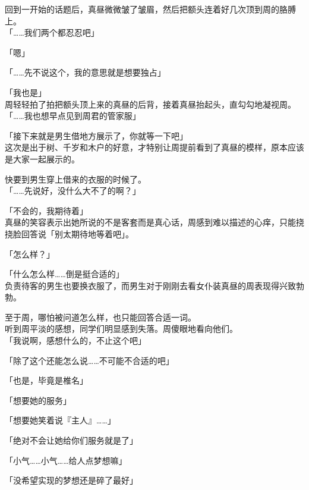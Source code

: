 回到一开始的话题后，真昼微微皱了皱眉，然后把额头连着好几次顶到周的胳膊上。\\

「……我们两个都忍忍吧」

「嗯」

「……先不说这个，我的意思就是想要独占」

「我也是」\\

周轻轻拍了拍把额头顶上来的真昼的后背，接着真昼抬起头，直勾勾地凝视周。\\

「……我也想早点见到周君的管家服」

「接下来就是男生借地方展示了，你就等一下吧」\\

这次是出于树、千岁和木户的好意，才特别让周提前看到了真昼的模样，原本应该是大家一起展示的。

快要到男生穿上借来的衣服的时候了。\\

「……先说好，没什么大不了的啊？」

「不会的，我期待着」\\

真昼的笑容表示出她所说的不是客套而是真心话，周感到难以描述的心痒，只能挠挠脸回答说「别太期待地等着吧」。\\

\vspace{2\baselineskip}

「怎么样？」

「什么怎么样……倒是挺合适的」\\

负责待客的男生也要换衣服了，而男生对于刚刚去看女仆装真昼的周表现得兴致勃勃。

至于周，哪怕被问道怎么样，也只能回答合适一词。\\

听到周平淡的感想，同学们明显感到失落。周傻眼地看向他们。\\

「我说啊，感想什么的，不止这个吧」

「除了这个还能怎么说……不可能不合适的吧」

「也是，毕竟是椎名」

「想要她的服务」

「想要她笑着说『主人』……」

「绝对不会让她给你们服务就是了」

「小气……小气……给人点梦想嘛」

「没希望实现的梦想还是碎了最好」

